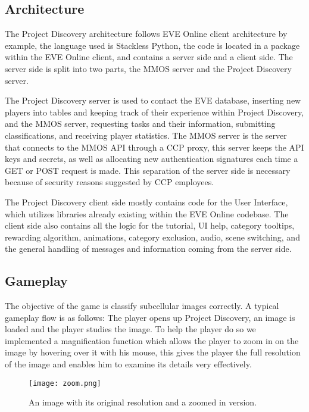 \subsection{Architecture}

	The Project Discovery architecture follows EVE Online client architecture by example, the language used is Stackless Python, the code is located in a package within the EVE Online client, and contains a server side and a client side. The server side is split into two parts, the MMOS server and the Project Discovery server. 

	The Project Discovery server is used to contact the EVE database, inserting new players into tables and keeping track of their experience within Project Discovery, and the MMOS server, requesting tasks and their information, submitting classifications, and receiving player statistics. The MMOS server is the server that connects to the MMOS API through a CCP proxy, this server keeps the API keys and secrets, as well as allocating new authentication signatures each time a GET or POST request is made. This separation of the server side is necessary because of security reasons suggested by CCP employees.

	The Project Discovery client side mostly contains code for the User Interface, which utilizes libraries already existing within the EVE Online codebase. The client side also contains all the logic for the tutorial, UI help, category tooltips, rewarding algorithm, animations, category exclusion, audio, scene switching, and the general handling of messages and information coming from the server side.

\subsection{Gameplay}
	The objective of the game is classify subcellular images correctly. A typical gameplay flow is as follows: The player opens up Project Discovery, an image is loaded and the player studies the image. To help the player do so we implemented a magnification function which allows the player to zoom in on the image by hovering over it with his mouse, this gives the player the full resolution of the image and enables him to examine its details very effectively.

	\begin{figure}[H]
	  \centering
	  \graphicspath{ {./graphics/} }
	  \centerline{\texttt{[image: zoom.png]}}
	  \caption{\label{fig:zoom}An image with its original resolution and a zoomed in version.}
	\end{figure} 

